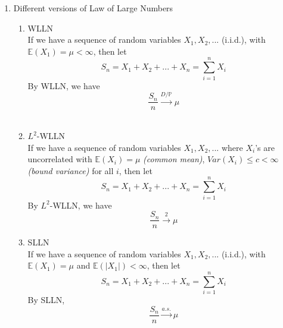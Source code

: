 \documentclass[11pt]{article}
\begin{document}
\begin{enumerate}
\item{Different versions of Law of Large Numbers}
\begin{enumerate}
\item{WLLN}\\
If we have a sequence of random variables $X_1 , X_2, ...$ (i.i.d.), with $\mathbb{E}(X_1) = \mu < \infty$, then let $$S_{n} =  X_1 + X_2 + ... + X_{n} = \sum_{i =1}^{n} X_{i}$$
By WLLN, we have $$\frac{S_{n}}{n} \xrightarrow{D/ \mathbb{P}} \mu$$\\
\item{$L^{2}$-WLLN}\\
If we have a sequence of random variables $X_1 , X_2, ...$ where $X_{i}$'s are uncorrelated with $\mathbb{E}(X_{i}) = \mu$ \textit{(common mean)}, $Var(X_{i}) \leq c < \infty$ \textit{(bound variance)} for all $i$, then let $$S_{n} =  X_1 + X_2 + ... + X_{n} = \sum_{i =1}^{n} X_{i}$$
By $L^{2}$-WLLN, we have $$\frac{S_{n}}{n} \xrightarrow{2} \mu$$
\item{SLLN}\\
If we have a sequence of random variables $X_1 , X_2, ...$ (i.i.d.), with $\mathbb{E}(X_1) = \mu$ and $\mathbb{E}(|X_1 |) < \infty$, then let $$S_{n} =  X_1 + X_2 + ... + X_{n} = \sum_{i =1}^{n} X_{i}$$
By SLLN, $$\frac{S_{n}}{n} \xrightarrow{a.s.} \mu$$
\end{enumerate}
\end{enumerate}
\end{document}
